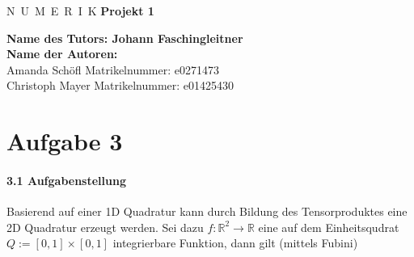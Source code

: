 \documentclass[a4paper,11pt,bibliography=totoc,listof=totoc,headinclude=true,cleardoublepage=empty,oneside]{scrbook}
\begin{document}

\begin{titlepage}
	\begin{center}
		\vskip 1cm%
		{\LARGE N~\Large U~M~E~R~I~K}
		\vskip 8mm
		{\huge\bfseries Projekt 1}
		\vskip 1cm
		
		{\Large\bfseries Name des Tutors: Johann Faschingleitner}\\[1ex]
		\vskip 0.5cm
		{\Large\bfseries Name der Autoren:}\\[1ex]
		\vskip 0.5cm
		Amanda Schöfl
		\vskip 0.5cm
		Matrikelnummer: e0271473\\[1ex]
		\vskip 0.5cm
		Christoph Mayer
		\vskip 0.5cm
		Matrikelnummer: e01425430\\[1ex]

		
	\end{center}
\end{titlepage}

\cleardoublepage
	
\chapter*{Aufgabe 3} %
\thispagestyle{empty}

\subsubsection{3.1 Aufgabenstellung}
Basierend auf einer 1D Quadratur kann durch Bildung des Tensorproduktes eine 2D Quadratur erzeugt werden. Sei dazu $f:	\mathbb{R} ^2 \to \mathbb{R}$ eine auf dem Einheitsqudrat $Q:=[0,1]\times[0,1]$ integrierbare Funktion, dann gilt (mittels Fubini)
		
\end{document}
